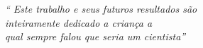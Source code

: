 \begin{epigrafe}
	\vspace*{\fill}
	\begin{flushright}
		\textit{``
		Este trabalho e seus futuros resultados são
		\\ inteiramente dedicado a criança a 
		\\ qual sempre falou que seria um cientista''}
	\end{flushright}
\end{epigrafe}
